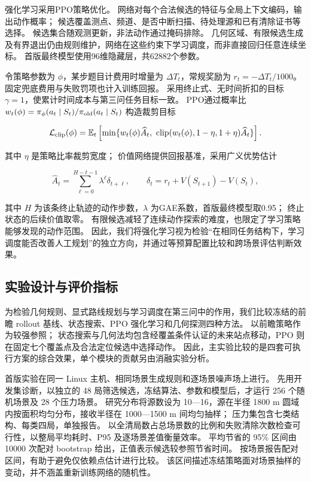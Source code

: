 强化学习采用PPO策略优化\cite{schulman2017ppo}。
网络对每个合法候选的特征与全局上下文编码，输出动作概率；
候选覆盖测点、频道、是否中断扫描、待处理源和已有清除证书等选择。
候选集合随观测更新，非法动作通过掩码排除。
几何区域、有限候选生成及有界退出仍由规则维护，网络在这些约束下学习调度，而非直接回归任意连续坐标。
首版最终模型使用96维隐藏层，共62882个参数。

令策略参数为 \(\phi\)，某步题目计费用时增量为 \(\Delta T_t\)，常规奖励为 \(r_t=-\Delta T_t/1000\)。
固定兜底费用与失败罚项也计入训练回报。
采用终止式、无时间折扣的目标 \(\gamma=1\)，使累计时间成本与第三问任务目标一致。
PPO通过概率比 \(w_t(\phi)=\pi_\phi(a_t\mid S_t)/\pi_{\rm old}(a_t\mid S_t)\) 构造裁剪目标

\begin{equation}\label{eq:q3-15}
\mathcal L_{\rm clip}(\phi)=\mathbb E_t\left[
\min\{w_t(\phi)\widehat A_t,\ 
\operatorname{clip}(w_t(\phi),1-\eta,1+\eta)\widehat A_t\}
\right].
\end{equation}

其中 \(\eta\) 是策略比率裁剪宽度；
价值网络提供回报基准，采用广义优势估计\cite{schulman2016gae}

\begin{equation}\label{eq:q3-16}
\widehat A_t=\sum_{\ell=0}^{H-t-1}\lambda^\ell\delta_{t+\ell},
\qquad \delta_t=r_t+V(S_{t+1})-V(S_t),
\end{equation}

其中 \(H\) 为该条终止轨迹的动作步数，\(\lambda\) 为GAE系数，首版最终模型取0.95；
终止状态的后续价值取零。
有限候选减轻了连续动作探索的难度，也限定了学习策略能够发现的动作范围。
因此，我们将强化学习视为检验``在相同任务结构下，学习调度能否改善人工规划''的独立方向，并通过等预算配置比较和跨场景评估判断效果。

\subsection{实验设计与评价指标}\label{sec:q3-8}

为检验几何规则、显式路线规划与学习调度在第三问中的作用，我们比较冻结的前瞻 rollout 基线、状态搜索、PPO 强化学习和几何探测四种方法。
以前瞻策略作为较强参照；
状态搜索与几何法均包含经覆盖条件认证的未来站点移动，PPO 则在固定七个覆盖点及合法定位候选中选择动作。
因此，主实验比较的是四套可执行方案的综合效果，单个模块的贡献另由消融实验分析。

首版实验在同一 Linux 主机、相同场景生成规则和逐场景噪声场上进行。
先用开发集诊断，以独立的 48 局筛选候选，冻结算法、参数和模型后，才运行 256 个随机场景及 28 个压力场景。
研究分布将源数设为 10---16，源在半径 1800 m 圆域内按面积均匀分布，接收半径在 1000---1500 m 间均匀抽样；
压力集包含七类结构、每类四局，单独报告。
以全清局数占总场景数的比例和失败清除次数检查可行性，以整局平均耗时、P95 及逐场景差值衡量效率。
平均节省的 95\% 区间由 10000 次配对 bootstrap 给出，正值表示候选较参照节省时间。
按场景报告配对区间，有助于避免仅依赖点估计进行比较\cite{agarwal2021}。
该区间描述冻结策略面对场景抽样的变动，并不涵盖重新训练网络的随机性。

